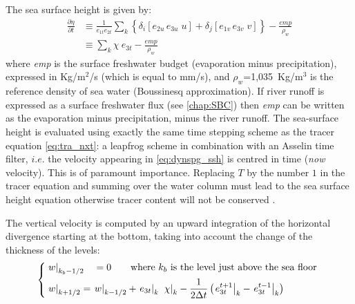 \documentclass[../tex_main/NEMO_manual]{subfiles}
\begin{document}
The sea surface height is given by:
\begin{equation} \label{eq:dynspg_ssh}
\begin{aligned}
\frac{\partial \eta }{\partial t}
&\equiv    \frac{1}{e_{1t} e_{2t} }\sum\limits_k { \left\{  \delta _i \left[ {e_{2u}\,e_{3u}\;u} \right]
                                                                                  +\delta _j \left[ {e_{1v}\,e_{3v}\;v} \right]  \right\} } 
           -    \frac{\textit{emp}}{\rho _w }   \\
&\equiv    \sum\limits_k {\chi \ e_{3t}}  -  \frac{\textit{emp}}{\rho _w }
\end{aligned}
\end{equation}
where \textit{emp} is the surface freshwater budget (evaporation minus precipitation), 
expressed in Kg/m$^2$/s (which is equal to mm/s),
and $\rho _w$=1,035~Kg/m$^3$ is the reference density of sea water (Boussinesq approximation).
If river runoff is expressed as a surface freshwater flux (see \autoref{chap:SBC}) then
\textit{emp} can be written as the evaporation minus precipitation, minus the river runoff. 
The sea-surface height is evaluated using exactly the same time stepping scheme as
the tracer equation \autoref{eq:tra_nxt}:
a leapfrog scheme in combination with an Asselin time filter,
$i.e.$ the velocity appearing in \autoref{eq:dynspg_ssh} is centred in time (\textit{now} velocity).
This is of paramount importance.
Replacing $T$ by the number $1$ in the tracer equation and summing over the water column must lead to
the sea surface height equation otherwise tracer content will not be conserved
\citep{Griffies_al_MWR01, Leclair_Madec_OM09}.

The vertical velocity is computed by an upward integration of the horizontal divergence starting at the bottom,
taking into account the change of the thickness of the levels:
\begin{equation} \label{eq:wzv}
\left\{   \begin{aligned}
&\left. w \right|_{k_b-1/2} \quad= 0    \qquad \text{where } k_b \text{ is the level just above the sea floor }  	\\
&\left. w \right|_{k+1/2}     = \left. w \right|_{k-1/2}  +  \left. e_{3t} \right|_{k}\;  \left. \chi \right|_k  
                                         - \frac{1} {2 \Delta t} \left(  \left. e_{3t}^{t+1}\right|_{k} - \left. e_{3t}^{t-1}\right|_{k}\right)
\end{aligned}   \right.
\end{equation}
\end{document}
